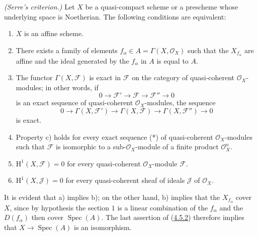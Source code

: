 \begin{theorem}[5.2.1]
\label{II.5.2.1}
\emph{(Serre's criterion.)} Let $X$ be a quasi-compact scheme or a prescheme
whose underlying space is Noetherian. The following conditions are
equivalent:
\begin{enumerate}
  \item[\rm{a)}] $X$ is an affine scheme.
  \item[\rm{b)}] There exists a family of elements
  $f_\alpha\in A=\Gamma(X,\mathcal{O}_X)$ such that the $X_{f_\alpha}$ are
  affine and the ideal generated by the $f_\alpha$ in $A$ is equal to
  $A$.
  \item[\rm{c)}] The functor $\Gamma(X,\mathcal{F})$ is exact in
  $\mathcal{F}$ on the category of quasi-coherent
  $\mathcal{O}_X$-modules; in other words, if
  \[
    0\to\mathcal{F}'\to\mathcal{F}\to\mathcal{F}''\to0 \tag{*}
  \]
  is an exact sequence of quasi-coherent $\mathcal{O}_X$-modules, the
  sequence
  \[
    0\to\Gamma(X,\mathcal{F}')\to\Gamma(X,\mathcal{F})
      \to\Gamma(X,\mathcal{F}'')\to0
  \]
  is exact.
  \item[\rm{c')}] Property c) holds for every exact sequence (*) of
  quasi-coherent $\mathcal{O}_X$-modules such that $\mathcal{F}$ is
  isomorphic to a sub-$\mathcal{O}_X$-module of a finite product
  $\mathcal{O}_X^n$.
  \item[\rm{d)}] $\mathrm{H}^1(X,\mathcal{F})=0$ for every
  quasi-coherent $\mathcal{O}_X$-module $\mathcal{F}$.
  \item[\rm{d')}] $\mathrm{H}^1(X,\mathcal{J})=0$ for every
  quasi-coherent sheaf of ideals $\mathcal{J}$ of $\mathcal{O}_X$.
\end{enumerate}
\end{theorem}

It is evident that a) implies b); on the other hand, b) implies that the
$X_{f_\alpha}$ cover $X$, since by hypothesis the section $1$ is a
linear combination of the $f_\alpha$ and the $D(f_\alpha)$ then cover
$\operatorname{Spec}(A)$. The last assertion of
(\hyperref[II.4.5.2]{4.5.2}) therefore implies that
$X\to\operatorname{Spec}(A)$ is an isomorphism.

